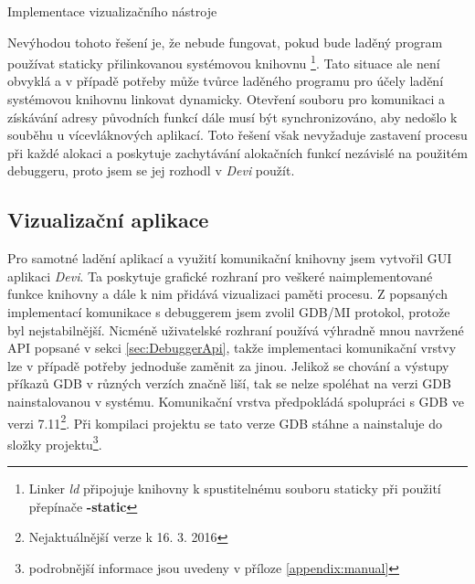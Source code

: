 \documentclass[bc,male,python,dept460]{diploma}						%
\newcommand{\parspace}[1][]{
	\ifthenelse{\isempty{#1}}{\vspace{5mm}}{\vspace{#1}}
	\par
}
\begin{document}
\begin{section}{Implementace vizualizačního nástroje}
\begin{description}
\begin{description}
				\parspace Nevýhodou tohoto řešení je, že nebude fungovat, pokud bude laděný program používat staticky přilinkovanou systémovou knihovnu
				\footnote{Linker \textit{ld} připojuje knihovny k spustitelnému souboru staticky při použití přepínače \textbf{-static}}.
				Tato situace ale není obvyklá a v případě potřeby může tvůrce laděného programu pro účely ladění systémovou knihovnu linkovat dynamicky.
				Otevření souboru pro komunikaci a získávání adresy původních funkcí dále musí být synchronizováno, aby nedošlo k souběhu u vícevláknových aplikací.
				Toto řešení však nevyžaduje zastavení procesu při každé alokaci a poskytuje zachytávání alokačních funkcí nezávislé na použitém debuggeru, proto
				jsem se jej rozhodl v \textit{Devi} použít.
				
			\end{description}
		\end{description}
			
	\subsection{Vizualizační aplikace}
	Pro samotné ladění aplikací a využití komunikační knihovny jsem vytvořil GUI aplikaci \textit{Devi}.
	Ta poskytuje grafické rozhraní pro veškeré naimplementované funkce knihovny a dále k nim přidává vizualizaci paměti procesu.
	Z popsaných implementací komunikace s debuggerem jsem zvolil GDB/MI protokol, protože byl nejstabilnější. Nicméně uživatelské rozhraní používá výhradně
	mnou navržené API popsané v sekci \ref{sec:DebuggerApi}, takže implementaci komunikační vrstvy lze v případě potřeby jednoduše zaměnit za jinou.
	Jelikož se chování a výstupy příkazů GDB v různých verzích značně liší, tak se nelze spoléhat na verzi GDB nainstalovanou v systému.
	Komunikační vrstva předpokládá spolupráci s GDB ve verzi 7.11\footnote{Nejaktuálnější verze k 16. 3. 2016}.
	Při kompilaci projektu se tato verze GDB stáhne a nainstaluje do složky projektu\footnote{podrobnější informace jsou uvedeny v příloze \ref{appendix:manual}}.
	
	

\end{section}
\end{document}
